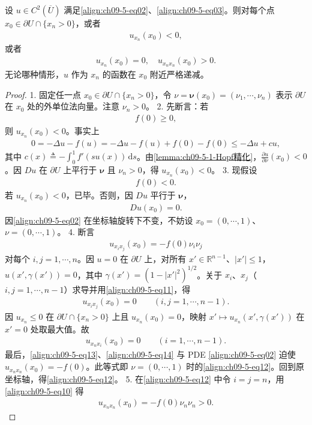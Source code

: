 \documentclass[../../main.tex]{subfiles}
\begin{document}
\begin{lemma}[边界估计]\label{lemma:ch09-5-2-边界估计}
设 $u\in C^2(\overline{U})$ 满足\eqref{align:ch09-5-eq02}、\eqref{align:ch09-5-eq03}。则对每个点 $x_0\in\partial U\cap\{x_n>0\}$，或者
\begin{align}
u_{x_n}(x_0)<0,\label{align:ch09-5-eq07}
\end{align}
或者
\begin{align}
u_{x_n}(x_0)=0,\quad u_{x_nx_n}(x_0)>0.\label{align:ch09-5-eq08}
\end{align}
无论哪种情形，$u$ 作为 $x_n$ 的函数在 $x_0$ 附近严格递减。
\begin{proof}
1. 固定任一点 $x_0\in\partial U\cap\{x_n>0\}$，令 $\nu=\boldsymbol{\nu}(x_0)=(\nu_1,\cdots,\nu_n)$ 表示 $\partial U$ 在 $x_0$ 处的外单位法向量。注意 $\nu_n>0$。
2. 先断言：若
\begin{align}
f(0)\geqslant 0,\label{align:ch09-5-eq09}
\end{align}
则 $u_{x_n}(x_0)<0$。事实上
\begin{align*}
0=-\Delta u-f(u)=-\Delta u-f(u)+f(0)-f(0)\leqslant-\Delta u+cu,
\end{align*}
其中 $c(x)\triangleq-\int_0^1 f'(su(x))\,\mathrm{d}s$。由\cref{lemma:ch09-5-1-Hopf精化}，$\frac{\partial u}{\partial\nu}(x_0)<0$。因 $Du$ 在 $\partial U$ 上平行于 $\boldsymbol{\nu}$ 且 $\nu_n>0$，得 $u_{x_n}(x_0)<0$。
3. 现假设
\begin{align}
f(0)<0.\label{align:ch09-5-eq10}
\end{align}
若 $u_{x_n}(x_0)<0$，已毕。否则，因 $Du$ 平行于 $\boldsymbol{\nu}$，
\begin{align}
Du(x_0)=0.\label{align:ch09-5-eq11}
\end{align}
因\eqref{align:ch09-5-eq02} 在坐标轴旋转下不变，不妨设 $x_0=(0,\cdots,1)$、$\nu=(0,\cdots,1)$。
4. 断言
\begin{align}
u_{x_ix_j}(x_0)=-f(0)\nu_i\nu_j\label{align:ch09-5-eq12}
\end{align}
对每个 $i,j=1,\cdots,n$。因 $u=0$ 在 $\partial U$ 上，对所有 $x'\in\mathbb{R}^{n-1}$、$|x'|\leqslant 1$，$u(x',\gamma(x'))=0$，其中 $\gamma(x')=(1-|x'|^2)^{1/2}$。关于 $x_i$、$x_j$（$i,j=1,\cdots,n-1$）求导并用\eqref{align:ch09-5-eq11}，得
\begin{align}
u_{x_ix_j}(x_0)=0\qquad (i,j=1,\cdots,n-1).\label{align:ch09-5-eq13}
\end{align}
因 $u_{x_n}\leqslant 0$ 在 $\partial U\cap\{x_n>0\}$ 上且 $u_{x_n}(x_0)=0$，映射 $x'\mapsto u_{x_n}(x',\gamma(x'))$ 在 $x'=0$ 处取最大值。故
\begin{align}
u_{x_nx_i}(x_0)=0\qquad (i=1,\cdots,n-1).\label{align:ch09-5-eq14}
\end{align}
最后，\eqref{align:ch09-5-eq13}、\eqref{align:ch09-5-eq14} 与 PDE \eqref{align:ch09-5-eq02} 迫使 $u_{x_nx_n}(x_0)=-f(0)$。此等式即 $\nu=(0,\cdots,1)$ 时的\eqref{align:ch09-5-eq12}。回到原坐标轴，得\eqref{align:ch09-5-eq12}。
5. 在\eqref{align:ch09-5-eq12} 中令 $i=j=n$，用\eqref{align:ch09-5-eq10} 得
\begin{align*}
u_{x_nx_n}(x_0)=-f(0)\nu_n\nu_n>0.
\end{align*}
\end{proof}
\end{lemma}
\end{document}
